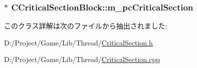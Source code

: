 \subsubsection[{m\+\_\+pc\+Critical\+Section}]{$\ast$ C\+Critical\+Section\+Block\+::m\+\_\+pc\+Critical\+Section\hspace{0.3cm}{\ttfamily [private]}}\label{class_c_critical_section_block_a85e6abc3f5091afdc7f8127737885974}


このクラス詳解は次のファイルから抽出されました\+:\begin{DoxyCompactItemize}
\item 
D\+:/\+Project/\+Game/\+Lib/\+Thread/\hyperlink{_critical_section_8h}{Critical\+Section.\+h}\item 
D\+:/\+Project/\+Game/\+Lib/\+Thread/\hyperlink{_critical_section_8cpp}{Critical\+Section.\+cpp}\end{DoxyCompactItemize}
